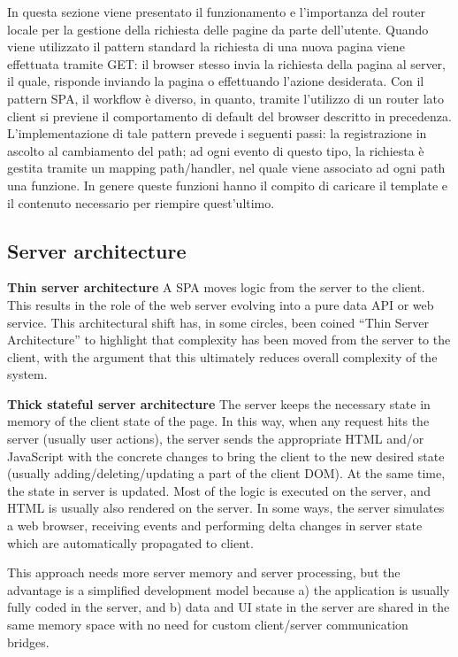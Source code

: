 In questa sezione viene presentato il funzionamento e l'importanza del router locale per la gestione della richiesta delle pagine da parte dell'utente. 
Quando viene utilizzato il pattern standard la richiesta di una nuova pagina viene effettuata tramite GET: il browser stesso invia la richiesta della pagina al server, il quale, risponde inviando la pagina o effettuando l'azione desiderata.
Con il pattern SPA, il workflow è diverso, in quanto, tramite l'utilizzo di un router lato client si previene il comportamento di default del browser descritto in precedenza.
L'implementazione di tale pattern prevede i seguenti passi: la registrazione in ascolto al cambiamento del path; ad ogni evento di questo tipo, la richiesta è gestita tramite un mapping path/handler, nel quale viene associato ad ogni path una funzione. In genere queste funzioni hanno il compito di caricare il template e il contenuto necessario per riempire quest'ultimo.

\subsection{Server architecture}

\textbf{Thin server architecture}
A SPA moves logic from the server to the client. This results in the role of the web server evolving into a pure data API or web service. This architectural shift has, in some circles, been coined ``Thin Server Architecture'' to highlight that complexity has been moved from the server to the client, with the argument that this ultimately reduces overall complexity of the system.

\textbf{Thick stateful server architecture}
The server keeps the necessary state in memory of the client state of the page. In this way, when any request hits the server (usually user actions), the server sends the appropriate HTML and/or JavaScript with the concrete changes to bring the client to the new desired state (usually adding/deleting/updating a part of the client DOM). At the same time, the state in server is updated. Most of the logic is executed on the server, and HTML is usually also rendered on the server. In some ways, the server simulates a web browser, receiving events and performing delta changes in server state which are automatically propagated to client.

This approach needs more server memory and server processing, but the advantage is a simplified development model because a) the application is usually fully coded in the server, and b) data and UI state in the server are shared in the same memory space with no need for custom client/server communication bridges.

